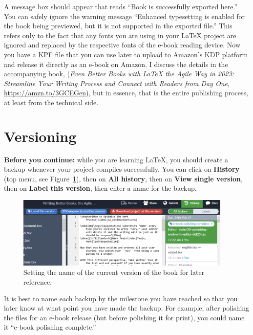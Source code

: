 A message box should appear that reads ``Book is successfully exported here.'' You can safely ignore the warning message ``Enhanced typesetting is enabled for the book being previewed, but it is not supported in the exported file.'' This refers only to the fact that any fonts you are using in your LaTeX project are ignored and replaced by the respective fonts of the e-book reading device. Now you have a KPF file that you can use later to upload to Amazon's KDP platform and release it directly as an e-book on Amazon. I discuss the details in the accompanying book, (\textit{Even Better Books with LaTeX the Agile Way in 2023: Streamline Your Writing Process and Connect with Readers from Day One}, \url{https://amzn.to/3GCEGen}), but in essence, that is the entire publishing process, at least from the technical side.



\section{Versioning}\label{versioning:sec} 

\textbf{Before you continue:} while you are learning LaTeX, you should create a backup whenever your project compiles successfully. You can click on \textbf{History} (top menu, see Figure~\ref{versions:fig}), then on \textbf{All history}, then on \textbf{View single version}, then on \textbf{Label this version}, then enter a name for the backup.

\begin{figure}[H]\centering
\includegraphics[width=0.95\textwidth]{images/versions.png}
\caption{Setting the name of the current version of the book for later reference.}
\label{versions:fig}
\end{figure}

It is best to name each backup by the milestone you have reached so that you later know at what point you have made the backup. For example, after polishing the files for an e-book release (but before polishing it for print), you could name it ``e-book polishing complete.''


